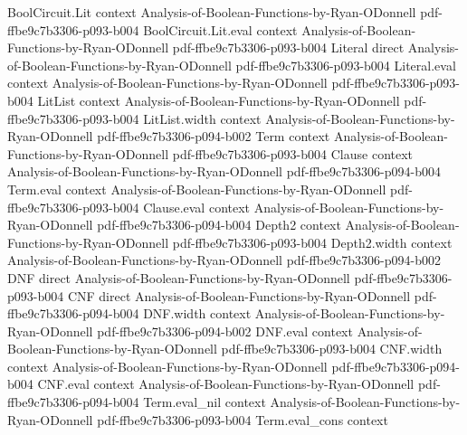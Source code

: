 \begin{lemma}
\leanok
{}
\proofstep
  {BoolCircuit.Lit}
  {context}
  {Analysis-of-Boolean-Functions-by-Ryan-ODonnell}
  {pdf-ffbe9c7b3306-p093-b004}
\proofstep
  {BoolCircuit.Lit.eval}
  {context}
  {Analysis-of-Boolean-Functions-by-Ryan-ODonnell}
  {pdf-ffbe9c7b3306-p093-b004}
\proofstep
  {Literal}
  {direct}
  {Analysis-of-Boolean-Functions-by-Ryan-ODonnell}
  {pdf-ffbe9c7b3306-p093-b004}
\proofstep
  {Literal.eval}
  {context}
  {Analysis-of-Boolean-Functions-by-Ryan-ODonnell}
  {pdf-ffbe9c7b3306-p093-b004}
\proofstep
  {LitList}
  {context}
  {Analysis-of-Boolean-Functions-by-Ryan-ODonnell}
  {pdf-ffbe9c7b3306-p093-b004}
\proofstep
  {LitList.width}
  {context}
  {Analysis-of-Boolean-Functions-by-Ryan-ODonnell}
  {pdf-ffbe9c7b3306-p094-b002}
\proofstep
  {Term}
  {context}
  {Analysis-of-Boolean-Functions-by-Ryan-ODonnell}
  {pdf-ffbe9c7b3306-p093-b004}
\proofstep
  {Clause}
  {context}
  {Analysis-of-Boolean-Functions-by-Ryan-ODonnell}
  {pdf-ffbe9c7b3306-p094-b004}
\proofstep
  {Term.eval}
  {context}
  {Analysis-of-Boolean-Functions-by-Ryan-ODonnell}
  {pdf-ffbe9c7b3306-p093-b004}
\proofstep
  {Clause.eval}
  {context}
  {Analysis-of-Boolean-Functions-by-Ryan-ODonnell}
  {pdf-ffbe9c7b3306-p094-b004}
\proofstep
  {Depth2}
  {context}
  {Analysis-of-Boolean-Functions-by-Ryan-ODonnell}
  {pdf-ffbe9c7b3306-p093-b004}
\proofstep
  {Depth2.width}
  {context}
  {Analysis-of-Boolean-Functions-by-Ryan-ODonnell}
  {pdf-ffbe9c7b3306-p094-b002}
\proofstep
  {DNF}
  {direct}
  {Analysis-of-Boolean-Functions-by-Ryan-ODonnell}
  {pdf-ffbe9c7b3306-p093-b004}
\proofstep
  {CNF}
  {direct}
  {Analysis-of-Boolean-Functions-by-Ryan-ODonnell}
  {pdf-ffbe9c7b3306-p094-b004}
\proofstep
  {DNF.width}
  {context}
  {Analysis-of-Boolean-Functions-by-Ryan-ODonnell}
  {pdf-ffbe9c7b3306-p094-b002}
\proofstep
  {DNF.eval}
  {context}
  {Analysis-of-Boolean-Functions-by-Ryan-ODonnell}
  {pdf-ffbe9c7b3306-p093-b004}
\proofstep
  {CNF.width}
  {context}
  {Analysis-of-Boolean-Functions-by-Ryan-ODonnell}
  {pdf-ffbe9c7b3306-p094-b004}
\proofstep
  {CNF.eval}
  {context}
  {Analysis-of-Boolean-Functions-by-Ryan-ODonnell}
  {pdf-ffbe9c7b3306-p094-b004}
\proofstep
  {Term.eval_nil}
  {context}
  {Analysis-of-Boolean-Functions-by-Ryan-ODonnell}
  {pdf-ffbe9c7b3306-p093-b004}
\proofstep
  {Term.eval_cons}
  {context}

\end{lemma}
